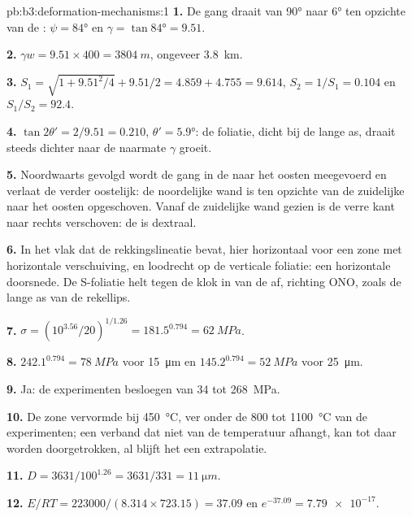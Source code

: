 \begin{solution}{pb:b3:deformation-mechanisms:1}
\textbf{1.} De gang draait van \ang{90} naar \ang{6} ten opzichte van de : $\psi =
\ang{84}$ en $\gamma = \tan\ang{84} = 9.51$.

\textbf{2.} $\gamma w = 9.51\times400 = \qty{3804}{m}$, ongeveer \qty{3.8}{km}.

\textbf{3.} $S_1 = \sqrt{1 + 9.51^2/4} + 9.51/2 = 4.859 + 4.755 = 9.614$,
$S_2 = 1/S_1 = 0.104$ en $S_1/S_2 = 92.4$.

\textbf{4.} $\tan2\theta' = 2/9.51 = 0.210$, $\theta' = \ang{5.9}$: de
foliatie, dicht bij de lange as, draait steeds dichter naar de  naarmate $\gamma$
groeit.

\textbf{5.} Noordwaarts gevolgd wordt de gang in de  naar het oosten meegevoerd en
verlaat de  verder oostelijk: de noordelijke wand is ten opzichte van de zuidelijke naar het oosten opgeschoven.
Vanaf de zuidelijke wand gezien is de verre kant naar rechts verschoven: de  is
dextraal.

\textbf{6.} In het vlak dat de rekkingslineatie bevat, hier horizontaal voor een zone met
horizontale verschuiving, en loodrecht op de verticale foliatie: een
horizontale doorsnede. De S-foliatie helt tegen de klok in van de  af, richting
ONO, zoals de lange as van de rekellips.

\textbf{7.} $\sigma = (10^{3.56}/20)^{1/1.26} = 181.5^{0.794} = \qty{62}{MPa}$.

\textbf{8.} $242.1^{0.794} = \qty{78}{MPa}$ voor \qty{15}{\micro m} en
$145.2^{0.794} = \qty{52}{MPa}$ voor \qty{25}{\micro m}.

\textbf{9.} Ja: de experimenten besloegen van 34 tot \qty{268}{MPa}.

\textbf{10.} De zone vervormde bij \qty{450}{\celsius}, ver onder de 800 tot
\qty{1100}{\celsius} van de experimenten; een verband dat niet van de
temperatuur afhangt, kan tot daar worden doorgetrokken, al blijft het
een extrapolatie.

\textbf{11.} $D = 3631/100^{1.26} = 3631/331 = \qty{11}{\micro m}$.

\textbf{12.} $E/RT = 223000/(8.314\times723.15) = 37.09$ en $e^{-37.09} =
\num{7.79e-17}$.


\end{solution}
